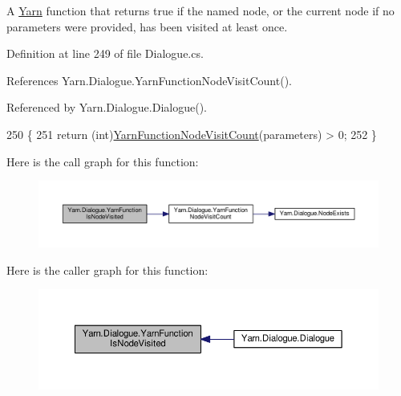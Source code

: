 A \hyperlink{a00051}{Yarn} function that returns true if the named node, or the current node if no parameters were provided, has been visited at least once. 



Definition at line 249 of file Dialogue.\-cs.



References Yarn.\-Dialogue.\-Yarn\-Function\-Node\-Visit\-Count().



Referenced by Yarn.\-Dialogue.\-Dialogue().


\begin{DoxyCode}
250         \{
251             \textcolor{keywordflow}{return} (\textcolor{keywordtype}{int})\hyperlink{a00092_a10c9f22d3f55e74f091cd6069c431094}{YarnFunctionNodeVisitCount}(parameters) > 0;
252         \}
\end{DoxyCode}


Here is the call graph for this function\-:
\nopagebreak
\begin{figure}[H]
\begin{center}
\leavevmode
\includegraphics[width=350pt]{a00092_a1ab129bd84381928531d503304ca08d6_cgraph}
\end{center}
\end{figure}




Here is the caller graph for this function\-:
\nopagebreak
\begin{figure}[H]
\begin{center}
\leavevmode
\includegraphics[width=350pt]{a00092_a1ab129bd84381928531d503304ca08d6_icgraph}
\end{center}
\end{figure}


